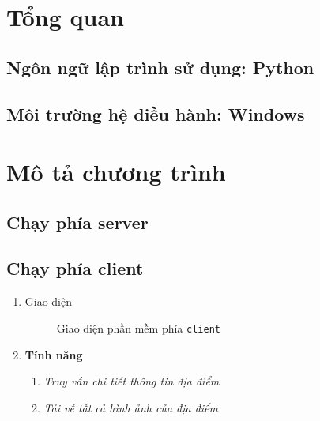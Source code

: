 \section{Tổng quan}
\subsection{Ngôn ngữ lập trình sử dụng: Python}
\subsection{Môi trường hệ điều hành: Windows}

\section{Mô tả chương trình}
\subsection{Chạy phía server}
\subsection{Chạy phía client}
\bf
\begin{enumerate}
\large\item Giao diện
\normalsize
\begin{figure}[H]
\caption{Giao diện phần mềm phía \texttt{client}}
\end{figure}

\large\item \bf Tính năng
\normalsize
\begin{enumerate}
\item \textit{Truy vấn chi tiết thông tin địa điểm}


\item \textit{Tải về tất cả hình ảnh của địa điểm}
\end{enumerate}
\end{enumerate}

